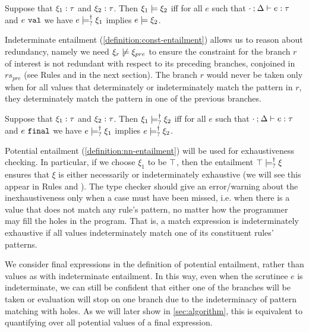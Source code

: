 \begin{definition}
  \label{definition:const-entailment}
  Suppose that $\xi_1 : \tau$ and $\xi_2 : \tau$.
  Then $\xi_1 \models \xi_2$ iff for all $e$ such that $\cdot \mathbin{;} \Delta \vdash e : \tau$ and $e ~\mathtt{val}$ we have $e \models_{?}^{\dag} \xi_1$ implies $e \models \xi_2$.
\end{definition}
Indeterminate entailment (\autoref{definition:const-entailment}) allows us to reason about redundancy, namely we need $\cnotsatisfy{\xi_r}{\xi_{pre}}$ to ensure the constraint for the branch $r$ of interest is not redundant with respect to its preceding branches, conjoined in $rs_{pre}$ (see Rules \TOneRules and \TRules in the next section).
The branch $r$ would never be taken only when for all values that determinately or indeterminately match the pattern in $r$, they determinately match the pattern in one of the previous branches.

\begin{definition}
  \label{definition:nn-entailment}
  Suppose that $\xi_1 : \tau$ and $\xi_2 : \tau$. Then $\xi_1 \models_{?}^{\dag} \xi_2$ iff for all $e$ such that $\cdot \mathbin{;} \Delta \vdash e : \tau$ and $e ~\mathtt{final}$ we have $e \models_{?}^{\dag} \xi_1$ implies $e \models_{?}^{\dag} \xi_2$.
\end{definition}
Potential entailment (\autoref{definition:nn-entailment}) will be used for exhaustiveness checking. In particular, if we choose $\xi_1$ to be $\top$, then the entailment $\top \models_{?}^{\dag} \xi$ ensures that $\xi$ is either necessarily or indeterminately exhaustive (we will see this appear in Rules \TMatchZPre and \TMatchNZPre). 
The type checker should give an error/warning about the inexhaustiveness only when a case must have been missed, i.e. when there is a value that does not match any rule's pattern, no matter how the programmer may fill the holes in the program. That is, a match expression is indeterminately exhaustive if all values indeterminately match one of its constituent rules' patterns.

We consider final expressions in the definition of potential entailment, rather than values as with indeterminate entailment. 
In this way, even when the scrutinee $e$ is indeterminate, we can still be confident that either one of the branches will be taken or evaluation will stop on one branch due to the indeterminacy of pattern matching with holes. As we will later show in \autoref{sec:algorithm}, this is equivalent to quantifying over all potential values of a final expression.


